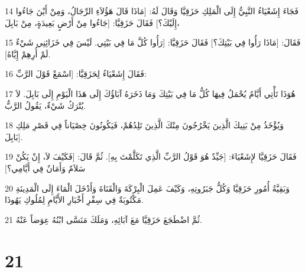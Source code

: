 \par 14 فَجَاءَ إِشَعْيَاءُ النَّبِيُّ إِلَى الْمَلِكِ حَزَقِيَّا وَقَالَ لَهُ: [مَاذَا قَالَ هَؤُلاَءِ الرِّجَالُ، وَمِنْ أَيْنَ جَاءُوا إِلَيْكَ؟] فَقَالَ حَزَقِيَّا: [جَاءُوا مِنْ أَرْضٍ بَعِيدَةٍ، مِنْ بَابِلَ،
\par 15 فَقَالَ: [مَاذَا رَأُوا فِي بَيْتِكَ؟] فَقَالَ حَزَقِيَّا: [رَأُوا كُلَّ مَا فِي بَيْتِي. لَيْسَ فِي خَزَائِنِي شَيْءٌ لَمْ أُرِهِمْ إِيَّاهُ].
\par 16 فَقَالَ إِشَعْيَاءُ لِحَزَقِيَّا: [اسْمَعْ قَوْلَ الرَّبِّ:
\par 17 هُوَذَا تَأْتِي أَيَّامٌ يُحْمَلُ فِيهَا كُلُّ مَا فِي بَيْتِكَ وَمَا ذَخَرَهُ آبَاؤُكَ إِلَى هَذَا الْيَوْمِ إِلَى بَابِلَ. لاَ يُتْرَكُ شَيْءٌ، يَقُولُ الرَّبُّ.
\par 18 وَيُؤْخَذُ مِنْ بَنِيكَ الَّذِينَ يَخْرُجُونَ مِنْكَ الَّذِينَ تَلِدُهُمْ، فَيَكُونُونَ خِصْيَاناً فِي قَصْرِ مَلِكِ بَابِلَ].
\par 19 فَقَالَ حَزَقِيَّا لإِشَعْيَاءَ: [جَيِّدٌ هُوَ قَوْلُ الرَّبِّ الَّذِي تَكَلَّمْتَ بِهِ]. ثُمَّ قَالَ: [فَكَيْفَ لاَ، إِنْ يَكُنْ سَلاَمٌ وَأَمَانٌ فِي أَيَّامِي؟]
\par 20 وَبَقِيَّةُ أُمُورِ حَزَقِيَّا وَكُلُّ جَبَرُوتِهِ، وَكَيْفَ عَمِلَ الْبِرْكَةَ وَالْقَنَاةَ وَأَدْخَلَ الْمَاءَ إِلَى الْمَدِينَةِ مَكْتُوبَةٌ فِي سِفْرِ أَخْبَارِ الأَيَّامِ لِمُلُوكِ يَهُوذَا.
\par 21 ثُمَّ اضْطَجَعَ حَزَقِيَّا مَعَ آبَائِهِ، وَمَلَكَ مَنَسَّى ابْنُهُ عِوَضاً عَنْهُ.

\chapter{21}

